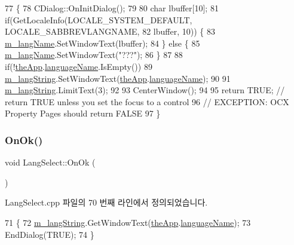 \begin{DoxyCode}
77 \{
78   CDialog::OnInitDialog();
79   
80   \textcolor{keywordtype}{char} lbuffer[10];
81   \textcolor{keywordflow}{if}(GetLocaleInfo(LOCALE\_SYSTEM\_DEFAULT, LOCALE\_SABBREVLANGNAME,
82                    lbuffer, 10)) \{
83     \mbox{\hyperlink{class_lang_select_ab18b546f12c8230292959ce2258ef240}{m\_langName}}.SetWindowText(lbuffer);
84   \} \textcolor{keywordflow}{else} \{
85     \mbox{\hyperlink{class_lang_select_ab18b546f12c8230292959ce2258ef240}{m\_langName}}.SetWindowText(\textcolor{stringliteral}{"???"});
86   \}
87   
88   \textcolor{keywordflow}{if}(!\mbox{\hyperlink{_v_b_a_8cpp_a8095a9d06b37a7efe3723f3218ad8fb3}{theApp}}.\mbox{\hyperlink{class_v_b_a_a9763c257edcdac0bff2b0ecab70ffc80}{languageName}}.IsEmpty())
89     \mbox{\hyperlink{class_lang_select_af75ddf60623799cb4c761692a8057b46}{m\_langString}}.SetWindowText(\mbox{\hyperlink{_v_b_a_8cpp_a8095a9d06b37a7efe3723f3218ad8fb3}{theApp}}.\mbox{\hyperlink{class_v_b_a_a9763c257edcdac0bff2b0ecab70ffc80}{languageName}});
90       
91   \mbox{\hyperlink{class_lang_select_af75ddf60623799cb4c761692a8057b46}{m\_langString}}.LimitText(3);
92   
93   CenterWindow();
94   
95   \textcolor{keywordflow}{return} TRUE;  \textcolor{comment}{// return TRUE unless you set the focus to a control}
96                 \textcolor{comment}{// EXCEPTION: OCX Property Pages should return FALSE}
97 \}
\end{DoxyCode}
\mbox{\label{class_lang_select_ad10c9461cc371d496c41ede46c64c35e}} 
\subsubsection{\texorpdfstring{On\+Ok()}{OnOk()}}
{\footnotesize\ttfamily void Lang\+Select\+::\+On\+Ok (\begin{DoxyParamCaption}{ }\end{DoxyParamCaption})\hspace{0.3cm}{\ttfamily [protected]}}



Lang\+Select.\+cpp 파일의 70 번째 라인에서 정의되었습니다.


\begin{DoxyCode}
71 \{
72   \mbox{\hyperlink{class_lang_select_af75ddf60623799cb4c761692a8057b46}{m\_langString}}.GetWindowText(\mbox{\hyperlink{_v_b_a_8cpp_a8095a9d06b37a7efe3723f3218ad8fb3}{theApp}}.\mbox{\hyperlink{class_v_b_a_a9763c257edcdac0bff2b0ecab70ffc80}{languageName}});
73   EndDialog(TRUE);
74 \}
\end{DoxyCode}


